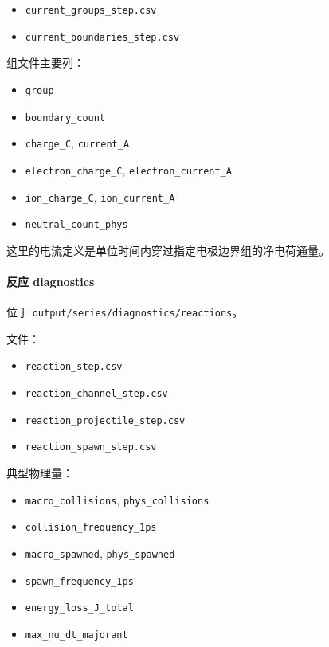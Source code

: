 \documentclass[11pt,a4paper]{ctexart}
\newcommand{\code}[1]{\texttt{#1}}
\newcommand{\file}[1]{\texttt{#1}}
\newcommand{\dir}[1]{\texttt{#1}}
\begin{document}
\begin{itemize}
  \item \file{current\_groups\_step.csv}
  \item \file{current\_boundaries\_step.csv}
\end{itemize}

组文件主要列：

\begin{itemize}
  \item \code{group}
  \item \code{boundary\_count}
  \item \code{charge\_C}, \code{current\_A}
  \item \code{electron\_charge\_C}, \code{electron\_current\_A}
  \item \code{ion\_charge\_C}, \code{ion\_current\_A}
  \item \code{neutral\_count\_phys}
\end{itemize}

这里的电流定义是单位时间内穿过指定电极边界组的净电荷通量。

\paragraph{反应 diagnostics}

位于 \dir{output/series/diagnostics/reactions}。

文件：

\begin{itemize}
  \item \file{reaction\_step.csv}
  \item \file{reaction\_channel\_step.csv}
  \item \file{reaction\_projectile\_step.csv}
  \item \file{reaction\_spawn\_step.csv}
\end{itemize}

典型物理量：

\begin{itemize}
  \item \code{macro\_collisions}, \code{phys\_collisions}
  \item \code{collision\_frequency\_1ps}
  \item \code{macro\_spawned}, \code{phys\_spawned}
  \item \code{spawn\_frequency\_1ps}
  \item \code{energy\_loss\_J\_total}
  \item \code{max\_nu\_dt\_majorant}
\end{itemize}
\end{document}

